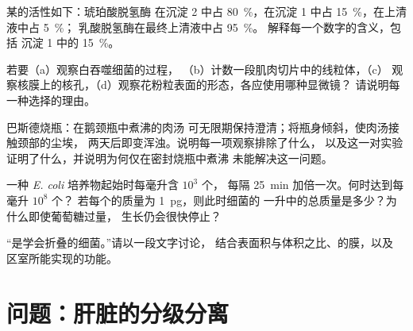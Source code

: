 \begin{exercise}[$\star\star$]\label{exo:b1:cell-unit-of-life:8}
某的活性如下：琥珀酸脱氢酶
在沉淀 2 中占 \qty{80}{\%}，在沉淀 1 中占 \qty{15}{\%}，在上清液中占 \qty{5}{\%}；
乳酸脱氢酶在最终上清液中占 \qty{95}{\%}。
解释每一个数字的含义，包括
沉淀 1 中的 \qty{15}{\%}。
\end{exercise}

\begin{exercise}[$\star\star$]\label{exo:b1:cell-unit-of-life:9}
若要（a）观察白吞噬细菌的过程，
（b）计数一段肌肉切片中的线粒体，（c）
观察核膜上的核孔，（d）观察花粉粒表面的形态，各应使用哪种显微镜？
请说明每一种选择的理由。
\end{exercise}

\begin{exercise}[$\star\star\star$]\label{exo:b1:cell-unit-of-life:10}
巴斯德烧瓶：在鹅颈瓶中煮沸的肉汤
可无限期保持澄清；将瓶身倾斜，使肉汤接触颈部的尘埃，
两天后即变浑浊。说明每一项观察排除了什么，
以及这一对实验证明了什么，并说明为何仅在密封烧瓶中煮沸
未能解决这一问题。
\end{exercise}

\begin{exercise}[$\star\star\star$]\label{exo:b1:cell-unit-of-life:11}
一种 \emph{E. coli} 培养物起始时每毫升含 $10^3$ 个，
每隔 \qty{25}{min} 加倍一次。何时达到每毫升 $10^8$ 个？
若每个的质量为 \qty{1}{pg}，则此时细菌的
一升中的总质量是多少？为什么即使葡萄糖过量，
生长仍会很快停止？
\end{exercise}

\begin{exercise}[$\star\star\star$]\label{exo:b1:cell-unit-of-life:12}
“是学会折叠的细菌。”请以一段文字讨论，
结合表面积与体积之比、的膜，以及
区室所能实现的功能。
\end{exercise}

\section{问题：肝脏的分级分离}

